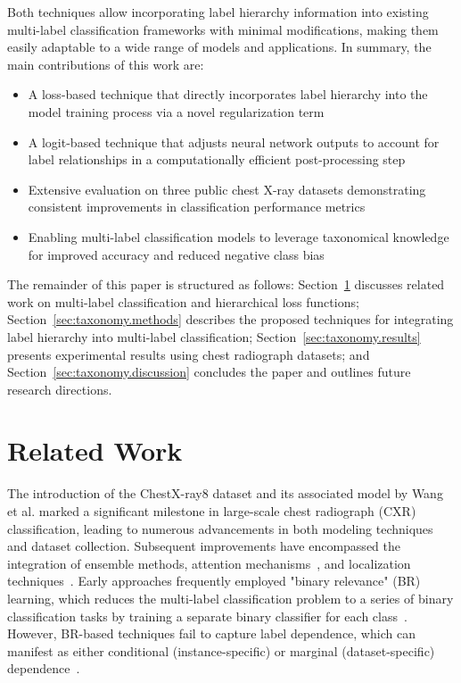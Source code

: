\documentclass[review,1p,times,numbers]{elsarticle}
\begin{document}
Both techniques allow incorporating label hierarchy information into existing multi-label classification frameworks with minimal modifications, making them easily adaptable to a wide range of models and applications.
In summary, the main contributions of this work are:
\begin{itemize}
    \item A loss-based technique that directly incorporates label hierarchy into the model training process via a novel regularization term
    \item A logit-based technique that adjusts neural network outputs to account for label relationships in a computationally efficient post-processing step
    \item Extensive evaluation on three public chest X-ray datasets demonstrating consistent improvements in classification performance metrics
    \item Enabling multi-label classification models to leverage taxonomical knowledge for improved accuracy and reduced negative class bias
\end{itemize}
The remainder of this paper is structured as follows: Section~\ref{sec:taxonomy.relatedwork} discusses related work on multi-label classification and hierarchical loss functions; Section~\ref{sec:taxonomy.methods} describes the proposed techniques for integrating label hierarchy into multi-label classification; Section~\ref{sec:taxonomy.results} presents experimental results using chest radiograph datasets; and Section~\ref{sec:taxonomy.discussion} concludes the paper and outlines future research directions.

\section{Related Work}\label{sec:taxonomy.relatedwork}
The introduction of the ChestX-ray8 dataset and its associated model by Wang et al.\cite{wang_ChestXRay8_2017} marked a significant milestone in large-scale chest radiograph (CXR) classification, leading to numerous advancements in both modeling techniques and dataset collection. Subsequent improvements have encompassed the integration of ensemble methods\cite{islam_Abnormality_2017}, attention mechanisms~\cite{guan_Diagnose_2018,liu_SDFN_2019}, and localization techniques~\cite{cai_Iterative_2018,guendel_MultiTask_2019,li_Thoracic_2018,yan_Weakly_2018}. Early approaches frequently employed "binary relevance" (BR) learning, which reduces the multi-label classification problem to a series of binary classification tasks by training a separate binary classifier for each class~\cite{zhang_Review_2014}. However, BR-based techniques fail to capture label dependence, which can manifest as either conditional (instance-specific) or marginal (dataset-specific) dependence~\cite{dembczynski_Label_2012}.
\end{document}

